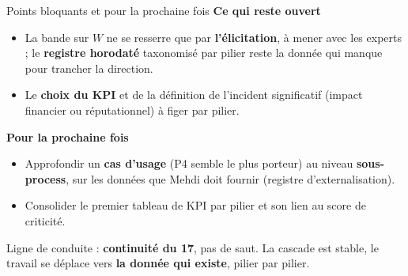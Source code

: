 \documentclass[11pt]{beamer}
\begin{document}
\begin{frame}{Points bloquants et pour la prochaine fois}
\small
\textbf{Ce qui reste ouvert}
\begin{itemize}
\item La bande sur $W$ ne se resserre que par \textbf{l'élicitation}, à mener avec les
      experts ; le \textbf{registre horodaté} taxonomisé par pilier reste la donnée qui
      manque pour trancher la direction.
\item Le \textbf{choix du KPI} et de la définition de l'\og{}incident significatif\fg{}
      (impact financier ou réputationnel) à figer par pilier.
\end{itemize}
\textbf{Pour la prochaine fois}
\begin{itemize}
\item Approfondir un \textbf{cas d'usage} (P4 semble le plus porteur) au niveau
      \textbf{sous-process}, sur les données que Mehdi doit fournir (registre
      d'externalisation).
\item Consolider le premier tableau de KPI par pilier et son lien au score de criticité.
\end{itemize}
\vfill
\begin{block}{}
Ligne de conduite : \textbf{continuité du 17}, pas de saut. La cascade est stable, le
travail se déplace vers \textbf{la donnée qui existe}, pilier par pilier.
\end{block}
\end{frame}
\end{document}
